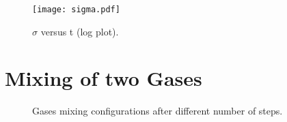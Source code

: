 \documentclass{article}
\begin{document}
\begin{figure}[h!]
\centering
\texttt{[image: sigma.pdf]}
\caption{$\sigma$ versus t (log plot).}
\label{sigma}
\end{figure}

\section{Mixing of two Gases}

\begin{figure}[h!]
\centering
\begin{subfigure}[b]{0.32\textwidth}
\end{subfigure}
\begin{subfigure}[b]{0.32\textwidth}
\end{subfigure}
\begin{subfigure}[b]{0.32\textwidth}
\end{subfigure}
\begin{subfigure}[b]{0.32\textwidth}
\end{subfigure}
\begin{subfigure}[b]{0.32\textwidth}
\end{subfigure}
\begin{subfigure}[b]{0.32\textwidth}
\end{subfigure}
\label{densities}
\caption{Gases mixing configurations after different number of steps.}
\end{figure}
\end{document}
